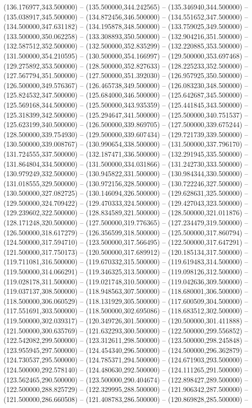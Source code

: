 (136.176977,343.500000) -- (135.500000,344.242565) -- (135.346940,344.500000) -- (135.038917,345.500000) -- (134.872456,346.500000) -- (134.551652,347.500000) -- (134.500000,347.631182) -- (134.195878,348.500000) -- (133.759025,349.500000) -- (133.500000,350.062258) -- (133.308893,350.500000) -- (132.904216,351.500000) -- (132.587512,352.500000) -- (132.500000,352.835299) -- (132.220885,353.500000) -- (131.500000,354.210595) -- (130.500000,354.166997) -- (129.500000,353.697468) -- (129.275892,353.500000) -- (128.500000,352.827633) -- (128.225233,352.500000) -- (127.567794,351.500000) -- (127.500000,351.392030) -- (126.957925,350.500000) -- (126.500000,349.576367) -- (126.465738,349.500000) -- (126.083230,348.500000) -- (125.824532,347.500000) -- (125.684000,346.500000) -- (125.642687,345.500000) -- (125.569168,344.500000) -- (125.500000,343.935359) -- (125.441845,343.500000) -- (125.318399,342.500000) -- (125.294647,341.500000) -- (125.500000,340.751537) -- (125.623199,340.500000) -- (126.500000,339.869705) -- (127.500000,339.675244) -- (128.500000,339.754930) -- (129.500000,339.607434) -- (129.721739,339.500000) -- (130.500000,339.008767) -- (130.990654,338.500000) -- (131.500000,337.796170) -- (131.724555,337.500000) -- (132.187471,336.500000) -- (132.291945,335.500000) -- (131.864804,334.500000) -- (131.500000,334.031866) -- (131.242730,333.500000) -- (130.979249,332.500000) -- (130.945822,331.500000) -- (130.984344,330.500000) -- (131.018555,329.500000) -- (130.972156,328.500000) -- (130.722246,327.500000) -- (130.500000,327.082725) -- (130.146094,326.500000) -- (129.628631,325.500000) -- (129.500000,324.709422) -- (129.470333,324.500000) -- (129.427043,323.500000) -- (129.239602,322.500000) -- (128.834589,321.500000) -- (128.500000,321.011876) -- (128.171248,320.500000) -- (127.500000,319.776365) -- (127.234479,319.500000) -- (126.500000,318.617279) -- (126.356599,318.500000) -- (125.500000,317.860794) -- (124.500000,317.594710) -- (123.500000,317.566495) -- (122.500000,317.647291) -- (121.500000,317.750173) -- (120.500000,317.689912) -- (120.185134,317.500000) -- (119.711081,316.500000) -- (119.670332,315.500000) -- (119.619483,314.500000) -- (119.500000,314.066291) -- (119.346325,313.500000) -- (119.098126,312.500000) -- (119.028178,311.500000) -- (119.021748,310.500000) -- (119.042636,309.500000) -- (119.037137,308.500000) -- (118.948563,307.500000) -- (118.680001,306.500000) -- (118.500000,306.060529) -- (118.131929,305.500000) -- (117.600509,304.500000) -- (117.551691,303.500000) -- (118.500000,302.695086) -- (118.683512,302.500000) -- (119.500000,302.039317) -- (120.349726,301.500000) -- (120.500000,301.411888) -- (121.500000,300.635769) -- (121.632293,300.500000) -- (122.500000,299.556852) -- (122.542082,299.500000) -- (123.312611,298.500000) -- (123.500000,298.245848) -- (123.955945,297.500000) -- (124.454340,296.500000) -- (124.500000,296.362879) -- (124.730537,295.500000) -- (124.785371,294.500000) -- (124.671903,293.500000) -- (124.500000,292.578140) -- (124.480630,292.500000) -- (124.111265,291.500000) -- (123.562465,290.500000) -- (123.500000,290.404674) -- (122.898427,289.500000) -- (122.500000,288.825729) -- (122.329995,288.500000) -- (121.906342,287.500000) -- (121.500000,286.660508) -- (121.408783,286.500000) -- (120.869828,285.500000) -- 